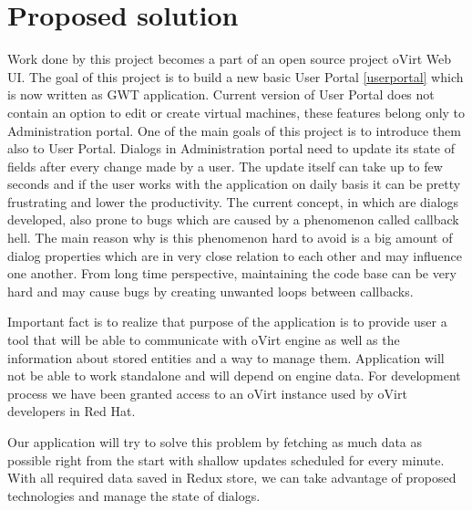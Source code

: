 \chapter{Proposed solution}
Work done by this project becomes a part of an open source project oVirt Web UI. The goal of this project is to build a new basic User Portal \ref{userportal} which is now written as GWT\cite{gwt} application.
Current version of User Portal does not contain an option to edit or create virtual machines, these features belong only to Administration portal. One of the main goals of this project is to introduce them also to User Portal.
Dialogs in Administration portal need to update its state of fields after every change made by a user. The update itself can take up to few seconds and if the user works with the application on daily basis it can be pretty frustrating and lower the productivity. 
The current concept, in which are dialogs developed, also prone to bugs which are caused by a phenomenon called callback hell\cite{callback_hell}. The main reason why is this phenomenon hard to avoid is a big amount of dialog properties which are in very close relation to each other and may influence one another. From long time perspective, maintaining the code base can be very hard and may cause bugs by creating unwanted loops between callbacks. 

Important fact is to realize that purpose of the application is to provide user a tool that will be able to communicate with oVirt engine as well as the information about stored entities and a way to manage them. Application will not be able to work standalone and will depend on engine data. For development process we have been granted access to an oVirt instance used by oVirt developers in Red Hat.  

Our application will try to solve this problem by fetching as much data as possible right from the start with shallow updates scheduled for every minute. With all required data saved in Redux store, we can take advantage of proposed technologies and manage the state of dialogs.

